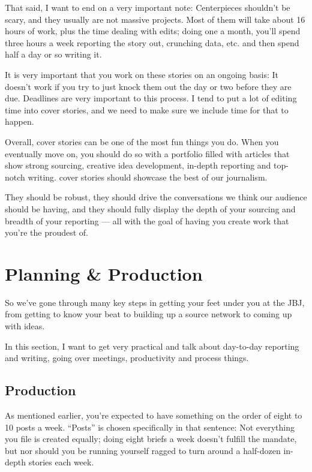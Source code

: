 \documentclass[
  12pt,
  american,
  letterpaperpaper,
  extrafontsizes,onecolumn,openright
  ]{memoir}
\begin{document}
That said, I want to end on a very important note: Centerpieces shouldn't be scary, and they usually are not massive projects. Most of them will take about 16 hours of work, plus the time dealing with edits; doing one a month, you'll spend three hours a week reporting the story out, crunching data, etc. and then spend half a day or so writing it.

It is very important that you work on these stories on an ongoing basis: It doesn't work if you try to just knock them out the day or two before they are due. Deadlines are very important to this process. I tend to put a lot of editing time into cover stories, and we need to make sure we include time for that to happen.

Overall, cover stories can be one of the most fun things you do. When you eventually move on, you should do so with a portfolio filled with articles that show strong sourcing, creative idea development, in-depth reporting and top-notch writing. cover stories should showcase the best of our journalism.

They should be robust, they should drive the conversations we think our audience should be having, and they should fully display the depth of your sourcing and breadth of your reporting --- all with the goal of having you create work that you're the proudest of.

\hypertarget{planning-production}{%
\chapter{Planning \& Production}\label{planning-production}}

So we've gone through many key steps in getting your feet under you at the JBJ, from getting to know your beat to building up a source network to coming up with ideas.

In this section, I want to get very practical and talk about day-to-day reporting and writing, going over meetings, productivity and process things.

\hypertarget{production}{%
\section*{Production}\label{production}}

As mentioned earlier, you're expected to have something on the order of eight to 10 posts a week. \enquote{Posts} is chosen specifically in that sentence: Not everything you file is created equally; doing eight briefs a week doesn't fulfill the mandate, but nor should you be running yourself ragged to turn around a half-dozen in-depth stories each week.
\end{document}
